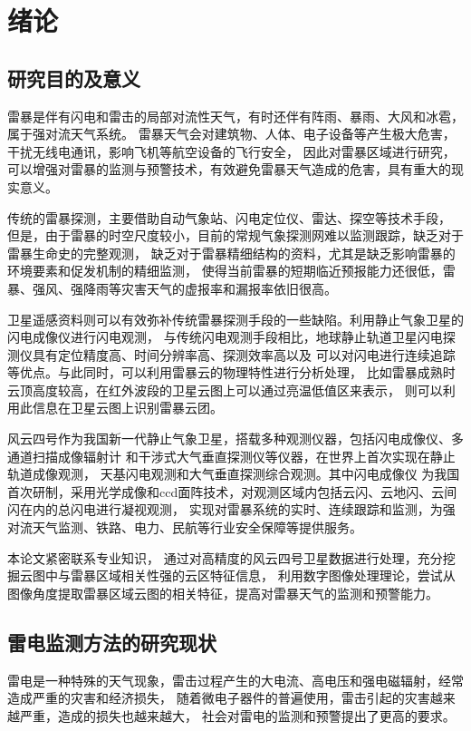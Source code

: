 
\chapter{绪论}

\section{研究目的及意义}
雷暴是伴有闪电和雷击的局部对流性天气，有时还伴有阵雨、暴雨、大风和冰雹，属于强对流天气系统。
雷暴天气会对建筑物、人体、电子设备等产生极大危害，干扰无线电通讯，影响飞机等航空设备的飞行安全，
因此对雷暴区域进行研究，可以增强对雷暴的监测与预警技术，有效避免雷暴天气造成的危害，具有重大的现实意义。

传统的雷暴探测，主要借助自动气象站、闪电定位仪、雷达、探空等技术手段，
但是，由于雷暴的时空尺度较小，目前的常规气象探测网难以监测跟踪，缺乏对于雷暴生命史的完整观测，
缺乏对于雷暴精细结构的资料，尤其是缺乏影响雷暴的环境要素和促发机制的精细监测，
使得当前雷暴的短期临近预报能力还很低，雷暴、强风、强降雨等灾害天气的虚报率和漏报率依旧很高\cite{linjin}。

卫星遥感资料则可以有效弥补传统雷暴探测手段的一些缺陷。利用静止气象卫星的闪电成像仪进行闪电观测，
与传统闪电观测手段相比，地球静止轨道卫星闪电探测仪具有定位精度高、时间分辨率高、探测效率高以及
可以对闪电进行连续追踪等优点。与此同时，可以利用雷暴云的物理特性进行分析处理，
比如雷暴成熟时云顶高度较高，在红外波段的卫星云图上可以通过亮温低值区来表示，
则可以利用此信息在卫星云图上识别雷暴云团。

风云四号作为我国新一代静止气象卫星，搭载多种观测仪器，包括闪电成像仪、多通道扫描成像辐射计
和干涉式大气垂直探测仪等仪器，在世界上首次实现在静止轨道成像观测，
天基闪电观测和大气垂直探测综合观测。其中闪电成像仪
为我国首次研制，采用光学成像和ccd面阵技术，对观测区域内包括云闪、云地闪、云间闪在内的总闪电进行凝视观测，
实现对雷暴系统的实时、连续跟踪和监测，为强对流天气监测、铁路、电力、民航等行业安全保障等提供服务。

本论文紧密联系专业知识，
通过对高精度的风云四号卫星数据进行处理，充分挖掘云图中与雷暴区域相关性强的云区特征信息，
利用数字图像处理理论，尝试从图像角度提取雷暴区域云图的相关特征，提高对雷暴天气的监测和预警能力。

\newpage

\section{雷电监测方法的研究现状}
雷电是一种特殊的天气现象，雷击过程产生的大电流、高电压和强电磁辐射，经常造成严重的灾害和经济损失，
随着微电子器件的普遍使用，雷击引起的灾害越来越严重，造成的损失也越来越大，
社会对雷电的监测和预警提出了更高的要求。

